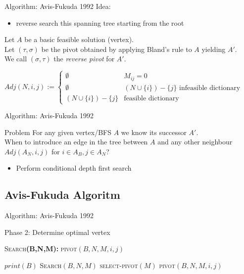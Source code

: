\documentclass[10pt]{beamer}
\begin{document}
\begin{frame}{Algorithm: Avis-Fukuda 1992}
	Idea: 
	\begin{itemize}
		\item reverse search this spanning tree starting from the root
	\end{itemize}
	\pause 
	\begin{definition}[]
		Let $A$ be a basic feasible solution (vertex).\\
		Let $(\tau, \sigma)$ be the pivot obtained by applying Bland's rule to $A$ yielding $A'$.  \\
		We call $(\sigma, \tau)$ the \textit{reverse pivot} for $A'$.
	\end{definition}
	\pause
	\begin{definition}[Neighbour]
		$Adj(N, i,j) := \left\{ \begin{matrix}
			\emptyset&M_{ij}=0\\
			\emptyset&(N\cup \{i\})-\{j\} \text{ infeasible dictionary}\\
			
			(N\cup \{i\})-\{j\}&\text{feasible dictionary}
			\end{matrix} \right.$
	\end{definition}
	
\end{frame}

\begin{frame}{Algorithm: Avis-Fukuda 1992}
	\begin{alertblock}{Problem}
		For any given vertex/BFS $A$ we know its successor $A'$. \\
		When to introduce an edge in the tree between $A$ and any other neighbour $Adj(A_N, i,j)$ for $i\in A_B, j\in A_N$?
	\end{alertblock}
	\pause 
	\begin{itemize}
		\item Perform conditional depth first search
	\end{itemize}
\end{frame}

\subsection{Avis-Fukuda Algoritm}
\begin{frame}{Algorithm: Avis-Fukuda 1992}
	\begin{algorithm}[H]
		\caption{Phase 2: Determine optimal vertex}
		\label{alg:seq}
		\begin{algorithmic}[1]
			\STATE \textsc{Search}\textbf{(B,N,M):}
			\STATE \textsc{pivot}$(B,N,M,i,j)$
			
			\STATE $print(B)$
			\ENDIF
			\STATE \textsc{Search}$(B,N,M)$
			\STATE \textsc{select-pivot}$(M)$
			\STATE \textsc{pivot}$(B,N,M,i,j)$
			
			\ENDIF
			\ENDFOR
		\end{algorithmic}
	\end{algorithm}
\end{frame}
\end{document}
